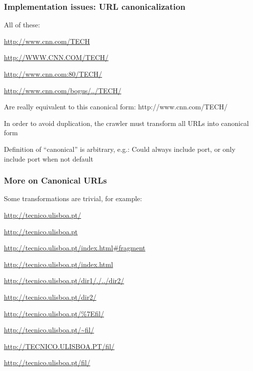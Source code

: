 \documentclass{beamer}
\begin{document}
\begin{frame} \frametitle{Implementation issues: URL canonicalization}

\begin{block}{ All of these:}

\url{http://www.cnn.com/TECH}

\url{http://WWW.CNN.COM/TECH/}

\url{http://www.cnn.com:80/TECH/}

\url{http://www.cnn.com/bogus/../TECH/}



\end{block}

\begin{block}{Are really equivalent to this canonical form:}
http://www.cnn.com/TECH/
\end{block}

In order to avoid duplication, the crawler must transform all URLs into canonical form

Definition of ``canonical'' is arbitrary, e.g.:
Could always include port, or only include port when not default

\end{frame}

\begin{frame} \frametitle{More on Canonical URLs}

Some transformations are trivial, for example:

\url{http://tecnico.ulisboa.pt/} 

\url{http://tecnico.ulisboa.pt}

\vspace{\baselineskip}

\url{http://tecnico.ulisboa.pt/index.html\#fragment}

\url{http://tecnico.ulisboa.pt/index.html}
\vspace{\baselineskip}

\url{http://tecnico.ulisboa.pt/dir1/./../dir2/}

\url{http://tecnico.ulisboa.pt/dir2/}
\vspace{\baselineskip}

\url{http://tecnico.ulisboa.pt/\%7Efil/}

\url{http://tecnico.ulisboa.pt/~fil/}
\vspace{\baselineskip}

\url{http://TECNICO.ULISBOA.PT/fil/}

\url{http://tecnico.ulisboa.pt/fil/}

\end{frame}
\end{document}
